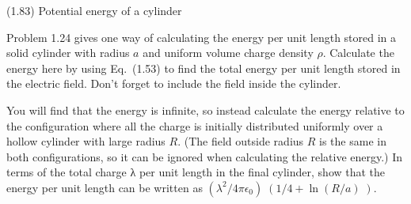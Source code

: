 \documentclass{article}
\begin{document}

\begin{homeworkProblem}
	(1.83) Potential energy of a cylinder

	Problem 1.24 gives one way of calculating the energy per unit length stored in a solid cylinder with radius $a$ and uniform volume charge density $\rho$. Calculate the energy here by using Eq.~(1.53) to find the total energy per unit length stored in the electric field. Don't forget to include the field inside the cylinder.

	You will find that the energy is infinite, so instead calculate the energy relative to the configuration where all the charge is initially distributed uniformly over a hollow cylinder with large radius $R$. (The field outside radius $R$ is the same in both configurations, so it can be ignored when calculating the relative energy.) In terms of the total charge λ per unit length in the final cylinder, show that the energy per unit length can be written as $(\lambda^2/4\pi\epsilon_0)􏰔\left(1/4+\ln(R/a)􏰕\right)$.

\end{homeworkProblem}
\end{document}
